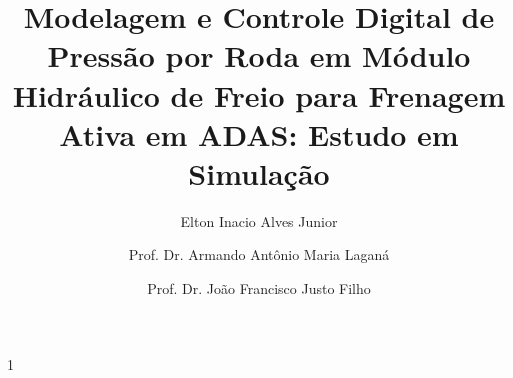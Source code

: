 \documentclass[a4paper]{ifacconf}
\def\portugues{1}
\def\portugues{0}
\begin{document}
\if\portugues1


   \begin{frontmatter}

      \title{Modelagem e Controle Digital de Pressão por Roda em Módulo Hidráulico de Freio para Frenagem Ativa em ADAS: Estudo em Simulação}



      \author[First]{Elton Inacio Alves Junior}
      \author[Second]{Prof. Dr. Armando Antônio Maria Laganá}
      \author[Third]{Prof. Dr. João Francisco Justo Filho}

      \address[First]{Departamento de Engenharia de Sistemas Eletrônicos, Escola Politécnica da Universidade de São Paulo (EPUSP), SP (e-mail: eltonalvesjunior@usp.br).}
      \address[Second]{Departamento de Engenharia de Sistemas Eletrônicos, Escola Politécnica da Universidade de São Paulo (EPUSP), SP (e-mail: lagana@lsi.usp.br)}
      \address[Third]{Departamento de Engenharia de Sistemas Eletrônicos, Escola Politécnica da Universidade de São Paulo (EPUSP), SP(e-mail: jjusto@lme.usp.br)}



\end{frontmatter}
\end{document}
